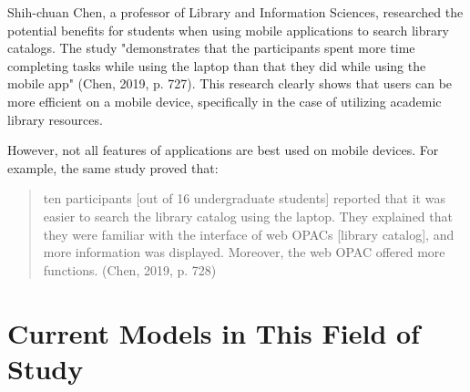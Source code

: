     Shih-chuan Chen, a professor of Library and Information Sciences, researched the potential benefits for students when using mobile applications to search library catalogs. The study "demonstrates that the participants spent more time completing tasks while using the laptop than that they did while using the mobile app" (Chen, 2019, p. 727). This research clearly shows that users can be more efficient on a mobile device, specifically in the case of utilizing academic library resources.
    
    However, not all features of applications are best used on mobile devices. For example, the same study proved that: \begin{quote} ten participants [out of 16 undergraduate students] reported that it was easier to search the library catalog using the laptop. They explained that they were familiar with the interface of web OPACs [library catalog], and more information was displayed. Moreover, the web OPAC offered more functions. (Chen, 2019, p. 728)\end{quote}
    
    
\section{Current Models in This Field of Study}

